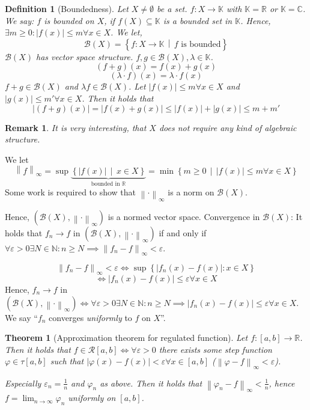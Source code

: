 \documentclass{article}
\newtheorem{theorem}{Theorem}  \numberwithin{theorem}{section}
\newtheorem{definition}{Definition}  \numberwithin{definition}{section}
\newtheorem{remark}{Remark}  \numberwithin{remark}{section}
\newcommand{\set}[1]{\left\{#1\right\}}
\newcommand{\setdef}[2]{\left\{\left.#1\,\middle|\,#2\right.\right\}}
\newcommand{\norm}[1]{\left\|#1\right\|}
\newcommand{\card}[1]{\left|#1\right|}
\begin{document}
\begin{definition}[Boundedness] %
  Let $X \neq \emptyset$ be a set.
  $f: X \to \mathbb K$ with $\mathbb K = \mathbb R$ or $\mathbb K = \mathbb C$.
  We say: $f$ is bounded on $X$, if $f(X) \subseteq \mathbb K$ is a bounded set in $\mathbb K$.
  Hence, $\exists m \geq 0: \card{f(x)} \leq m \forall x \in X$.
  We let,
  \[ \mathcal B(X) = \setdef{f: X \to \mathbb K}{f \text{ is bounded}} \]
  $\mathcal B(X)$ has vector space structure.
  $f, g \in \mathcal B(X), \lambda \in \mathbb K$.
  \[ (f + g)(x) = f(x) + g(x) \]
  \[ (\lambda \cdot f)(x) = \lambda \cdot f(x) \]
  $f + g \in \mathcal B(X)$ and $\lambda f \in \mathcal B(X)$.
  Let $\card{f(x)} \leq m \forall x \in X$ and $\card{g(x)} \leq m' \forall x \in X$.
  Then it holds that
  \[ \card{(f + g)(x)} = \card{f(x) + g(x)} \leq \card{f(x)} + \card{g(x)} \leq m + m' \]
\end{definition}

\begin{remark}
  It is very interesting, that $X$ does not require any kind of algebraic structure.
\end{remark}

We let
\[
  \norm{f}_{\infty}
  = \sup\underbrace{\setdef{\card{f(x)}}{x \in X}}_{\text{bounded in } \mathbb R}
  = \min\setdef{m \geq 0}{\card{f(x)} \leq m \forall x \in X}
\]
Some work is required to show that $\norm{\cdot}_{\infty}$ is a norm on $\mathcal B(X)$.

Hence, $(\mathcal B(X), \norm{\cdot}_{\infty})$ is a normed vector space.
Convergence in $\mathcal B(X)$: It holds that $f_n \to f$ in $(\mathcal B(X), \norm{\cdot}_{\infty})$
if and only if $\forall \varepsilon > 0 \exists N \in \mathbb N: n \geq N \implies \norm{f_n - f}_{\infty} < \varepsilon$.

\[ \norm{f_n - f}_{\infty} < \varepsilon \iff \sup\set{\card{f_n(x) - f(x)}: x \in X} \]
\[ \iff \card{f_n(x) - f(x)} \leq \varepsilon \forall x \in X \]
Hence, $f_n \to f$ in $(\mathcal B(X), \norm{\cdot}_{\infty}) \iff \forall \varepsilon > 0 \exists N \in \mathbb N: n \geq N \implies \card{f_n(x) - f(x)} \leq \varepsilon \forall x \in X$.
We say \enquote{$f_n$ converges \emph{uniformly} to $f$ on $X$}.

\begin{theorem}[Approximation theorem for regulated function]
  Let $f: [a, b] \to \mathbb R$. Then it holds that $f \in \mathcal R[a,b] \iff \forall \varepsilon > 0$ there exists some step function $\varphi \in \tau[a,b]$ such that $\card{\varphi(x) - f(x)} < \varepsilon \forall x \in [a,b]$ ($\norm{\varphi - f}_{\infty} < \varepsilon$).

  Especially $\varepsilon_n = \frac1n$ and $\varphi_n$ as above.
  Then it holds that $\norm{\varphi_n - f}_{\infty} < \frac1n$, hence $f = \lim_{n\to\infty} \varphi_n$ uniformly on $[a,b]$.
\end{theorem}
\end{document}
